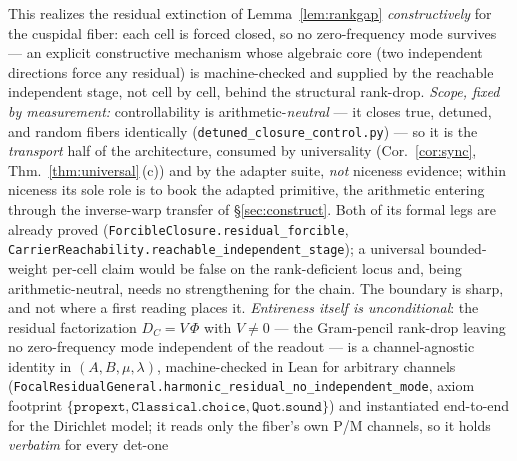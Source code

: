 \documentclass[11pt]{article}
\theoremstyle{definition}
\begin{document}
\noindent This realizes the residual extinction of Lemma~\ref{lem:rankgap} \emph{constructively} for the cuspidal
fiber: each cell is forced closed, so no zero-frequency mode survives --- an explicit constructive mechanism whose
algebraic core (two independent directions force any residual) is machine-checked and supplied by the reachable
independent stage, not cell by cell, behind the structural rank-drop. \emph{Scope, fixed by measurement:}
controllability is arithmetic-\emph{neutral} --- it closes true, detuned, and random fibers identically
(\texttt{detuned\_closure\_control.py}) --- so it is the \emph{transport} half of the architecture, consumed by
universality (Cor.~\ref{cor:sync}, Thm.~\ref{thm:universal}\,(c)) and by the adapter suite, \emph{not} niceness
evidence; within niceness its sole role is to book the adapted primitive, the arithmetic entering through the
inverse-warp transfer of \S\ref{sec:construct}. Both of its formal legs are already proved
(\texttt{ForcibleClosure.residual\_forcible}, \texttt{CarrierReachability.reachable\_independent\_stage}); a
universal bounded-weight per-cell claim would be false on the rank-deficient locus and, being
arithmetic-neutral, needs no strengthening for the chain. The boundary is sharp, and not where a first reading places it. \emph{Entireness itself is
unconditional}: the residual factorization $D_C=V\,\Phi$ with $V\neq0$ --- the Gram-pencil rank-drop leaving no
zero-frequency mode independent of the readout --- is a channel-agnostic identity in $(A,B,\mu,\lambda)$,
machine-checked in Lean for arbitrary channels
(\texttt{FocalResidualGeneral.harmonic\_residual\_no\_independent\_mode}, axiom footprint
$\{\texttt{propext},\texttt{Classical.choice},\texttt{Quot.sound}\}$) and instantiated end-to-end for the
Dirichlet model; it reads only the fiber's own P/M channels, so it holds \emph{verbatim} for every det-one
\end{document}
